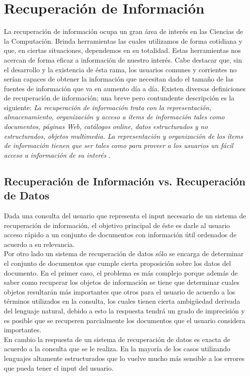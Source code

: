 \section{Recuperación de Información}
	La recuperación de información ocupa un gran área de interés en las Ciencias de la Computación. Brinda herramientas las cuales utilizamos de forma cotidiana y que, en ciertas situaciones, dependemos en su totalidad. Estas herramientas nos acercan de forma eficaz a información de nuestro interés. Cabe destacar que, sin el desarrollo y la existencia de ésta rama, los usuarios comunes y corrientes no serían capaces de obtener la información que necesitan dado el tamaño de las fuentes de información que va en aumento día a día. Existen diversas definiciones de recuperación de información; una breve pero contundente descripción es la siguiente: \textit{La recuperación de información trata con la representación, almacenamiento, organización y acceso a ítems de información tales como documentos, páginas Web, catálogos online, datos estructurados y no estructurados, objetos multimedia. La representación y organización de los ítems de información tienen que ser tales como para proveer a los usuarios un fácil acceso a información de su interés} \cite{baeza1999}.
	
	\subsection{Recuperación de Información vs. Recuperación de Datos}
	Dada una consulta del usuario que representa el input necesario de un sistema de recuperación de información, el objetivo principal de éste es darle al usuario acceso rápido a un conjunto de documentos con información útil ordenados de acuerdo a su relevancia.  \\
	Por otro lado un sistema de recuperación de datos sólo se encarga de determinar el conjunto de documentos que cumple cierta proposición sobre los datos del documento.
	En el primer caso, el problema es más complejo porque además de saber como recuperar los objetos de información se tiene que determinar cuales objetos resultarán más importantes que otros para el usuario de acuerdo a los términos utilizados en la consulta, los cuales tienen cierta ambigüedad derivada del lenguaje natural, debido a esto la respuesta tendrá un grado de imprecisión y es posible que se recuperen parcialmente los documentos que el usuario considera importantes. \\
	En cambio la respuesta de un sistema de recuperación de datos es exacta de acuerdo a la consulta que se le realiza. En la mayoría de los casos utilizando lenguajes altamente estructurados que lo vuelve mucho más sensible a los errores que pueda tener el input del usuario.
	
